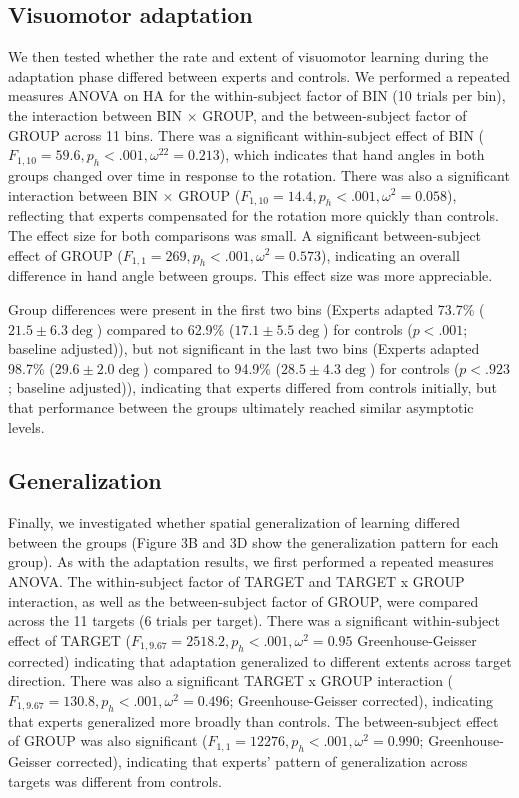 \documentclass[jou, 11pt, longtable, floatsintext, notab]{apa6}
\begin{document}
\subsection{Visuomotor adaptation}
We then tested whether the rate and extent of visuomotor
learning during the adaptation phase differed between
experts and controls. We performed a repeated measures ANOVA
on HA for the within-subject factor of BIN (10 trials per
bin), the interaction between BIN $\times$ GROUP, and the
between-subject factor of GROUP across 11 bins. There was a
significant within-subject effect of BIN ($F_{1,10} = 59.6,
p_h <.001, \omega^22 = 0.213$), which indicates that hand
angles in both groups changed over time in response to the
rotation. There was also a significant interaction between
BIN $\times$ GROUP ($F_{1,10} = 14.4, p_h <.001, \omega^2 =
0.058$), reflecting that experts compensated for the
rotation more quickly than controls. The effect size for
both comparisons was small. A significant between-subject
effect of GROUP ($F_{1,1} = 269, p_h <.001, \omega^2 =
0.573$), indicating an overall difference in hand angle
between groups. This effect size was more appreciable.

Group differences were present in the first two bins
(Experts adapted 73.7\% ($21.5 \pm 6.3 \deg$) compared to
62.9\% ($17.1 \pm 5.5 \deg$) for controls ($p<.001$;
baseline adjusted)), but not significant in the last two
bins (Experts adapted 98.7\% ($29.6 \pm 2.0\deg$) compared
to 94.9\% ($28.5 \pm 4.3\deg$) for controls ($p<.923$;
baseline adjusted)), indicating that experts differed from
controls initially, but that performance between the groups
ultimately reached similar asymptotic levels.

\subsection{Generalization}
Finally, we investigated whether spatial generalization of
learning differed between the groups (Figure 3B and 3D show
the generalization pattern for each group). As with the
adaptation results, we first performed a repeated measures
ANOVA. The within-subject factor of TARGET and TARGET x
GROUP interaction, as well as the between-subject factor of
GROUP, were compared across the 11 targets (6 trials per
target). There was a significant within-subject effect of
TARGET ($F_{1,9.67} = 2518.2, p_h <.001, \omega^2 = 0.95$
Greenhouse-Geisser corrected) indicating that adaptation
generalized to different extents across target direction.
There was also a significant TARGET x GROUP interaction
($F_{1,9.67} = 130.8, p_h <.001, \omega^2 = 0.496$;
Greenhouse-Geisser corrected), indicating that experts
generalized more broadly than controls. The between-subject
effect of GROUP was also significant ($F_{1,1} = 12276, p_h
<.001, \omega^2 = 0.990$; Greenhouse-Geisser corrected),
indicating that experts’ pattern of generalization across
targets was different from controls.
\end{document}

